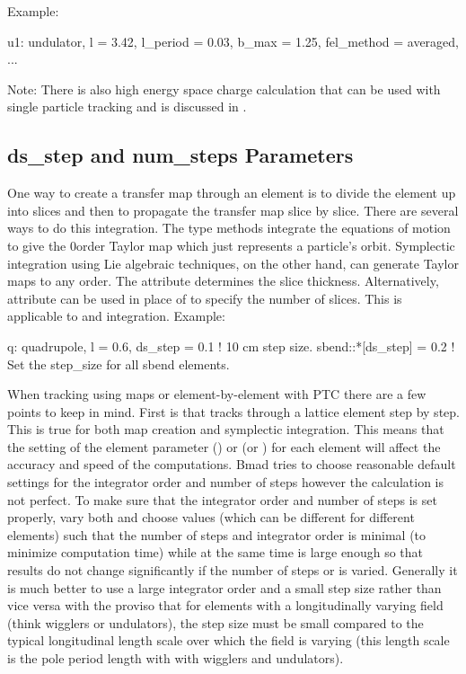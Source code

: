 Example:
\begin{example}
  u1: undulator, l = 3.42, l_period = 0.03, b_max = 1.25, fel_method = averaged, ...
\end{example}

Note: There is also high energy space charge calculation that can be used with single particle
tracking and is discussed in .

\subsection{ds_step and num_steps Parameters}
\label{s:ds.step}

One way to create a transfer map through an element is to divide the element up into slices and then
to propagate the transfer map slice by slice.  There are several ways to do this integration. The
 type methods integrate the equations of motion to give the 0\Th order Taylor map
which just represents a particle's orbit.  Symplectic integration
using Lie algebraic techniques, on the other hand, can generate Taylor maps to any order. The
 attribute determines the slice thickness.  Alternatively,  attribute can
be used in place of  to specify the number of slices.  This is applicable to
 and  integration. Example:
\begin{example}
  q: quadrupole, l = 0.6, ds_step = 0.1  ! 10 cm step size.
  sbend::*[ds_step] = 0.2                ! Set the step_size for all sbend elements.
\end{example}

When tracking using maps or element-by-element with PTC there are a few points to keep in
mind. First is that  tracks through a lattice element step by step. This is true for both
map creation and symplectic integration. This means that the setting of the element parameter
 ()
or  (or ) for each element will affect the accuracy and speed of the
computations. Bmad tries to choose reasonable default settings for the integrator order and number
of steps however the calculation is not perfect. To make sure that the integrator order and number
of steps is set properly, vary both and choose values (which can be different for different
elements) such that the number of steps and integrator order is minimal (to minimize computation
time) while at the same time is large enough so that results do not change significantly if the
number of steps or is varied. Generally it is much better to use a large integrator order and a
small step size rather than vice versa with the proviso that for elements with a longitudinally
varying field (think wigglers or undulators), the step size must be small compared to the typical
longitudinal length scale over which the field is varying (this length scale is the pole period
length with with wigglers and undulators).

